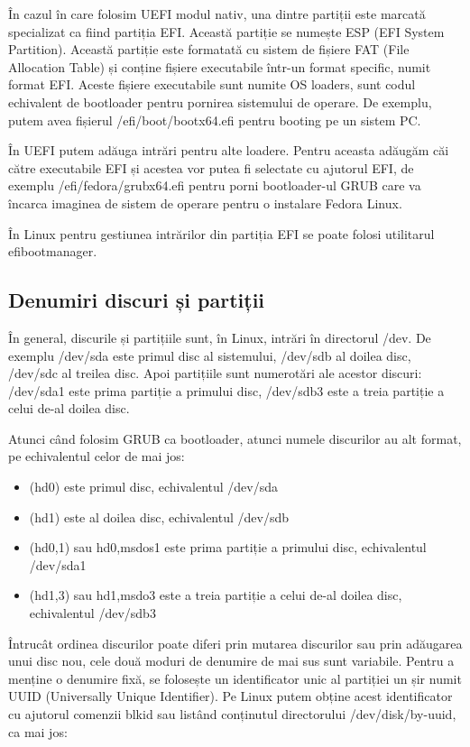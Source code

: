 În cazul în care folosim UEFI modul nativ, una dintre partiții este marcată
specializat ca fiind partiția EFI. Această partiție se numește ESP (EFI System
Partition). Această partiție este formatată cu sistem de fișiere FAT (File
Allocation Table) și conține fișiere executabile într-un format specific, numit
format EFI. Aceste fișiere executabile sunt numite OS loaders, sunt codul
echivalent de bootloader pentru pornirea sistemului de operare. De exemplu,
putem avea fișierul /efi/boot/bootx64.efi pentru booting pe un sistem PC.

În UEFI putem adăuga intrări pentru alte loadere. Pentru aceasta adăugăm căi
către executabile EFI și acestea vor putea fi selectate cu ajutorul EFI, de
exemplu /efi/fedora/grubx64.efi pentru porni bootloader-ul GRUB care va încarca
imaginea de sistem de operare pentru o instalare Fedora Linux.

În Linux pentru gestiunea intrărilor din partiția EFI se poate folosi utilitarul
efibootmanager.

\subsection{Denumiri discuri și partiții}
\label{sec:boot-bootdev-denumiri}

În general, discurile și partițiile sunt, în Linux, intrări în directorul /dev.
De exemplu /dev/sda este primul disc al sistemului, /dev/sdb al doilea disc,
/dev/sdc al treilea disc. Apoi partițiile sunt numerotări ale acestor discuri:
/dev/sda1 este prima partiție a primului disc, /dev/sdb3 este a treia partiție a
celui de-al doilea disc.

Atunci când folosim GRUB ca bootloader, atunci numele discurilor au alt format,
pe echivalentul celor de mai jos:

\begin{itemize}
	\item (hd0) este primul disc, echivalentul /dev/sda
	\item (hd1) este al doilea disc, echivalentul /dev/sdb
	\item (hd0,1) sau hd0,msdos1 este prima partiție a primului disc,
		echivalentul /dev/sda1
	\item (hd1,3) sau hd1,msdo3 este a treia partiție a celui de-al doilea
		disc, echivalentul /dev/sdb3
\end{itemize}

Întrucât ordinea discurilor poate diferi prin mutarea discurilor sau prin
adăugarea unui disc nou, cele două moduri de denumire de mai sus sunt variabile.
Pentru a menține o denumire fixă, se folosește un identificator unic al
partiției un șir numit UUID (Universally Unique Identifier). Pe Linux putem
obține acest identificator cu ajutorul comenzii blkid sau listând conținutul
directorului /dev/disk/by-uuid, ca mai jos:

